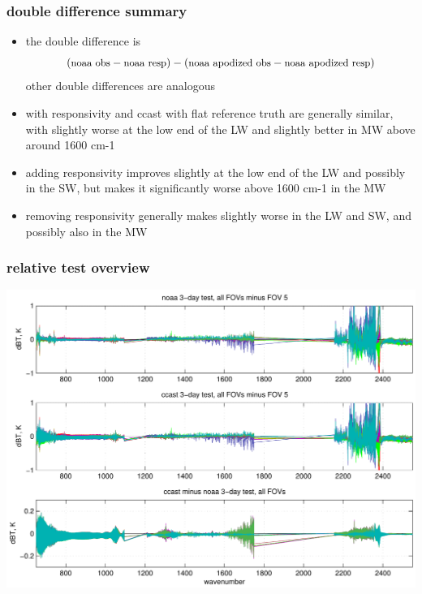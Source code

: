 \documentclass[11pt]{beamer}
\begin{document}
\begin{frame}
\frametitle{double difference summary}

\begin{itemize}

  \item the {\noaa} double difference is \[(\mbox{\small noaa obs} -
    \mbox{\small noaa resp}) - (\mbox{\small noaa apodized obs} -
    \mbox{\small noaa apodized resp})\]  
    other double differences are analogous

  \item {\noaa} with responsivity and ccast with flat reference
    truth are generally similar, with {\ccast} slightly worse at the
    low end of the LW and slightly better in MW above around 1600
    cm-1

  \item adding responsivity improves {\ccast} slightly at the low
    end of the LW and possibly in the SW, but makes it significantly
    worse above 1600 cm-1 in the MW

  \item removing responsivity generally makes {\noaa} slightly worse
    in the LW and SW, and possibly also in the MW

\end{itemize}

\end{frame}
\begin{frame}
\frametitle{relative test overview}
\begin{center}
  \includegraphics[scale=0.5]{figures/rel_summary.pdf}
\end{center}
\end{frame}
\end{document}
